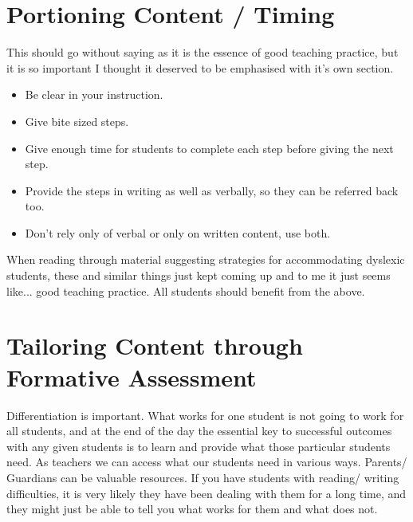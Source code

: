 \documentclass[17pt]{memoir}
\begin{document}
%
%
%



\section*{Portioning Content / Timing}

This should go without saying as it is the essence of good teaching practice, but it is so important I thought it deserved to be emphasised with it's own section. 
\begin{itemize}
	\item Be clear in your instruction.
	\item Give bite sized steps.
	\item Give enough time for students to complete each step before giving the next step.
	\item Provide the steps in writing as well as verbally, so they can be referred back too.
	\item Don't rely only of verbal or only on written content, use both.
\end{itemize}
When reading through material suggesting strategies for accommodating dyslexic students, these and similar things just kept coming up and to me it just seems like... good teaching practice. All students should benefit from the above.



\section*{Tailoring Content through Formative Assessment}

Differentiation is important. What works for one student is not going to work for all students, and at the end of the day the essential key to successful outcomes with any given students is to learn and provide what those particular students need. As teachers we can access what our students need in various ways. Parents/ Guardians can be valuable resources. If you have students with reading/ writing difficulties, it is very likely they have been dealing with them for a long time, and they might just be able to tell you what works for them and what does not.
\end{document}
